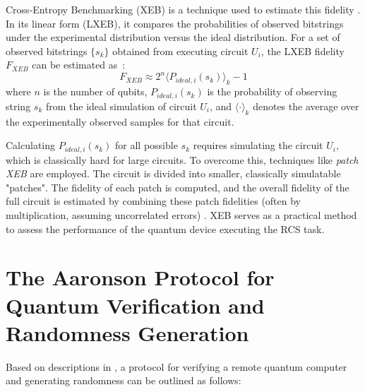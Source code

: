 \documentclass[11pt, a4paper]{article}
\begin{document}
Cross-Entropy Benchmarking (XEB) is a technique used to estimate this fidelity \cite{GoogleRCSBlog}. In its linear form (LXEB), it compares the probabilities of observed bitstrings under the experimental distribution versus the ideal distribution.
For a set of observed bitstrings $\{s_k\}$ obtained from executing circuit $U_i$, the LXEB fidelity $F_{XEB}$ can be estimated as~\cite{Arute-2019}:
\[ F_{XEB} \approx 2^n \langle P_{ideal, i}(s_k) \rangle_{k} - 1 \]
where $n$ is the number of qubits, $P_{ideal, i}(s_k)$ is the probability of observing string $s_k$ from the ideal simulation of circuit $U_i$, and $\langle \cdot \rangle_k$ denotes the average over the experimentally observed samples for that circuit.

Calculating $P_{ideal, i}(s_k)$ for all possible $s_k$ requires simulating the circuit $U_i$, which is classically hard for large circuits. To overcome this, techniques like \textit{patch XEB}  are employed. The circuit is divided into smaller, classically simulatable "patches". The fidelity of each patch is computed, and the overall fidelity of the full circuit is estimated by combining these patch fidelities (often by multiplication, assuming uncorrelated errors) \cite{GoogleRCSBlog}. XEB serves as a practical method to assess the performance of the quantum device executing the RCS task.

\section{The Aaronson Protocol for Quantum Verification and Randomness Generation}

Based on descriptions in \cite{AaronsonPatent, AaronsonBlog}, a protocol for verifying a remote quantum computer and generating randomness can be outlined as follows:
\end{document}
